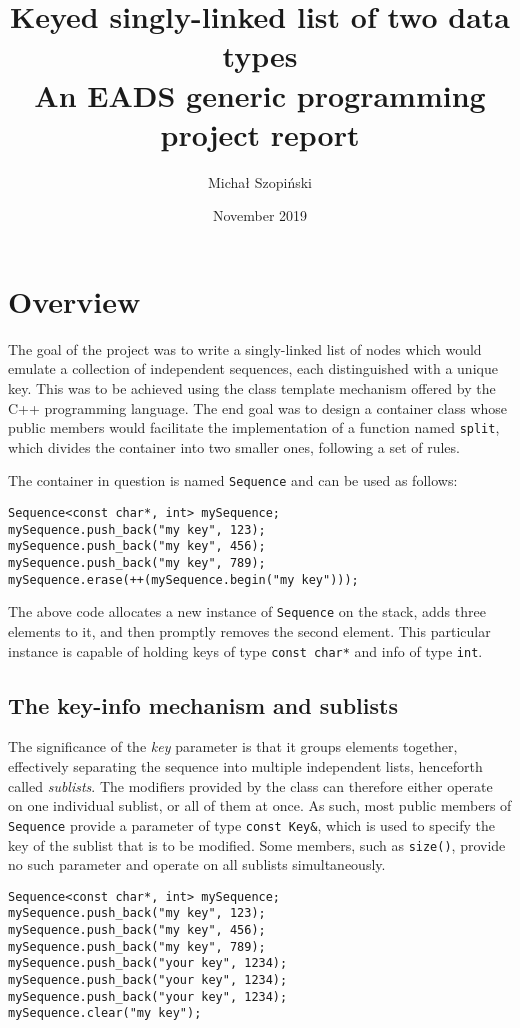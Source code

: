 ﻿\documentclass{article}
\title{
	Keyed singly-linked list of two data types \\
	\large An EADS generic programming project report
}
\date{November 2019}
\author{Michał Szopiński}
\begin{document}
\maketitle

\section{Overview}

The goal of the project was to write a singly-linked list of nodes which would
emulate a collection of independent sequences, each distinguished with a unique
key. This was to be achieved using the class template mechanism offered by the
C++ programming language. The end goal was to design a container class whose
public members would facilitate the implementation of a function named
{\tt split}, which divides the container into two smaller ones, following
a set of rules.

The container in question is named {\tt Sequence} and can be used as follows:

\begin{verbatim}
Sequence<const char*, int> mySequence;
mySequence.push_back("my key", 123);
mySequence.push_back("my key", 456);
mySequence.push_back("my key", 789);
mySequence.erase(++(mySequence.begin("my key")));
\end{verbatim}

The above code allocates a new instance of {\tt Sequence} on the stack,
adds three elements to it, and then promptly removes the second element.
This particular instance is capable of holding keys of type {\tt const char*}
and info of type {\tt int}.

\subsection{The key-info mechanism and sublists}

The significance of the {\it key} parameter is that it groups elements together,
effectively separating the sequence into multiple independent lists, henceforth
called {\it sublists}. The modifiers provided by the class can therefore either
operate on one individual sublist, or all of them at once. As such, most public
members of {\tt Sequence} provide a parameter of type {\tt const Key\&}, which
is used to specify the key of the sublist that is to be modified. Some members,
such as {\tt size()}, provide no such parameter and operate on all sublists
simultaneously.

\begin{verbatim}
Sequence<const char*, int> mySequence;
mySequence.push_back("my key", 123);
mySequence.push_back("my key", 456);
mySequence.push_back("my key", 789);
mySequence.push_back("your key", 1234);
mySequence.push_back("your key", 1234);
mySequence.push_back("your key", 1234);
mySequence.clear("my key");
\end{verbatim}
\end{document}
